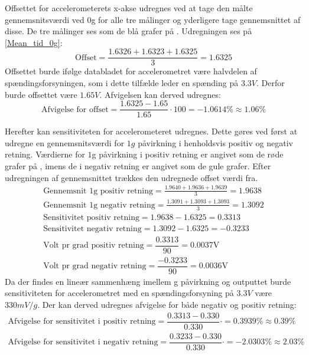 Offsettet for accelerometerets x-akse udregnes ved at tage den målte gennemsnitsværdi ved $0$g for alle tre målinger og yderligere tage gennemsnittet af disse. De tre målinger ses som de blå grafer på . Udregningen ses på \ref{Mean_tid_0g}:
\begin{equation}\label{Mean_tid_0g}
\text{Offset} = \frac{1.6326 + 1.6323 + 1.6325}{3} = 1.6325
\end{equation}
\noindent Offsettet burde ifølge databladet for accelerometret være halvdelen af spændingsforsyningen, som i dette tilfælde leder en spænding på $3.3V$. \cite{Devices2009} Derfor burde offsettet være $1.65V$. Afvigelsen kan derved udregnes:
\begin{equation}
\text{Afvigelse for offset} = \dfrac{1.6325 - 1.65}{1.65} \cdot 100 = -1.0614\% \approx 1.06\%
\end{equation}

\noindent Herefter kan sensitiviteten for accelerometeret udregnes. Dette gøres ved først at udregne en gennemsnitsværdi for $1g$ påvirkning i henholdsvis positiv og negativ retning. Værdierne for $1$g påvirkning i positiv retning er angivet som de røde grafer på , imens de i negativ retning er angivet som de gule grafer. Efter udregningen af gennemsnittet trækkes den udregnede offset værdi fra.
\
\begin{align}\label{taeskelvaerdi_pr_grad}
	\text{Gennemsnit 1g positiv retning} = \frac{1.9640 + 1.9636 + 1.9639}{3} = 1.9638 \\
	\text{Gennemsnit 1g negativ retning} = \frac{1.3091 + 1.3093 + 1.3093}{3} = 1.3092 \\
	\text{Sensitivitet positiv retning} = 1.9638 - 1.6325 = 0.3313 \\
	\text{Sensitivitet negativ retning} = 1.3092 - 1.6325 = -0.3233 \\
	\text{Volt pr grad positiv retning} = \dfrac{0.3313}{90} = 0.0037\text{V} \\
	\text{Volt pr grad negativ retning} = \dfrac{-0.3233}{90} = 0.0036\text{V}
\end{align}
\noindent Da der findes en lineær sammenhæng imellem g påvirkning og outputtet burde sensitiviteten for accelerometret med en spændingsforsyning på $3.3V$ være $330mV/g$. Der kan derved udregnes afvigelse for både negativ og positiv retning:
\begin{align}
	\text{Afvigelse for sensitivitet i positiv retning} = \dfrac{0.3313 - 0.330}{0.330} \cdot = 0.3939\% \approx 0.39\% \\
	\text{Afvigelse for sensitivitet i negativ retning} = \dfrac{0.3233 - 0.330}{0.330} \cdot = -2.0303\% \approx 2.03\%
\end{align}

